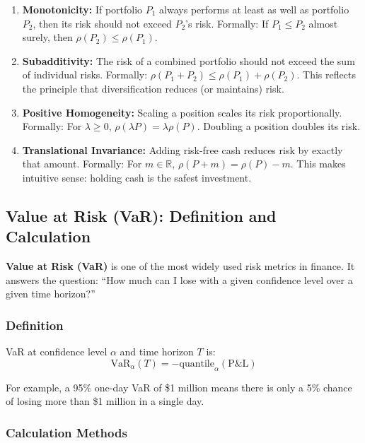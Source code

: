\begin{enumerate}
    \item \textbf{Monotonicity:} If portfolio $P_1$ always performs at least as well as portfolio $P_2$, then its risk should not exceed $P_2$'s risk. Formally: If $P_1 \leq P_2$ almost surely, then $\rho(P_2) \leq \rho(P_1)$.
    
    \item \textbf{Subadditivity:} The risk of a combined portfolio should not exceed the sum of individual risks. Formally: $\rho(P_1 + P_2) \leq \rho(P_1) + \rho(P_2)$. This reflects the principle that diversification reduces (or maintains) risk.
    
    \item \textbf{Positive Homogeneity:} Scaling a position scales its risk proportionally. Formally: For $\lambda \geq 0$, $\rho(\lambda P) = \lambda \rho(P)$. Doubling a position doubles its risk.
    
    \item \textbf{Translational Invariance:} Adding risk-free cash reduces risk by exactly that amount. Formally: For $m \in \mathbb{R}$, $\rho(P + m) = \rho(P) - m$. This makes intuitive sense: holding cash is the safest investment.
\end{enumerate}

\subsection{Value at Risk (VaR): Definition and Calculation}

\textbf{Value at Risk (VaR)} is one of the most widely used risk metrics in finance. It answers the question: ``How much can I lose with a given confidence level over a given time horizon?''

\subsubsection{Definition}

VaR at confidence level $\alpha$ and time horizon $T$ is:
\begin{equation}
    \text{VaR}_\alpha(T) = -\text{quantile}_\alpha(\text{P\&L})
\end{equation}

For example, a 95\% one-day VaR of \$1 million means there is only a 5\% chance of losing more than \$1 million in a single day.

\subsubsection{Calculation Methods}

